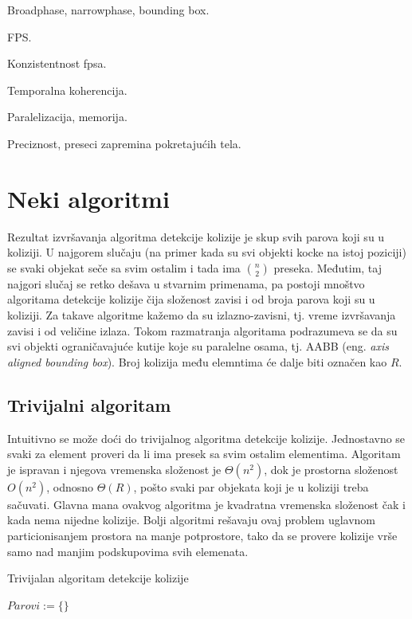 \documentclass[a4paper]{article}
\newtheorem{defi}{Definicija}[section]
\begin{document}
{Broadphase, narrowphase, bounding box.

FPS. 

Konzistentnost fpsa.

Temporalna koherencija.

Paralelizacija, memorija.

Preciznost, preseci zapremina pokretajućih tela.

\section{Neki algoritmi}
\label{sec:algoritmi}

Rezultat izvršavanja algoritma detekcije kolizije je skup svih parova koji su u koliziji.
U najgorem slučaju (na primer kada su svi objekti kocke na istoj poziciji) se svaki objekat
seče sa svim ostalim i tada ima $ {n\choose 2}  $ preseka. Međutim, taj najgori slučaj se retko dešava
u stvarnim primenama, pa postoji mnoštvo algoritama detekcije kolizije čija složenost zavisi i od broja
parova koji su u koliziji. Za takave algoritme kažemo da su izlazno-zavisni, tj.
vreme izvršavanja zavisi i od veličine izlaza. Tokom razmatranja algoritama podrazumeva se da su svi
objekti ograničavajuće kutije koje su paralelne osama, tj. AABB (eng. {\em axis aligned bounding box}).
Broj kolizija među elemntima će dalje biti označen kao $R$. 






\subsection{Trivijalni algoritam}
\label{subsec:octree}

Intuitivno se može doći do trivijalnog algoritma detekcije kolizije. 
Jednostavno se svaki za element proveri da li ima presek sa svim ostalim elementima.
Algoritam je ispravan i njegova vremenska složenost je $\Theta (n^2) $, dok je prostorna složenost
$O(n^2)$, odnosno $\Theta(R)$, pošto svaki par objekata koji je u koliziji treba sačuvati.
Glavna mana ovakvog algoritma je kvadratna vremenska složenost čak i kada nema nijedne kolizije.
Bolji algoritmi rešavaju ovaj problem uglavnom particionisanjem prostora na manje potprostore, tako da
se provere kolizije vrše samo nad manjim podskupovima svih elemenata.

\begin{algorithm}
	\caption{Trivijalan algoritam detekcije kolizije}
    \label{alg:triv}
	\begin{algorithmic}[1]
		\State $Parovi := \{ \}$


\end{algorithmic}
\end{algorithm}}
\end{document}
